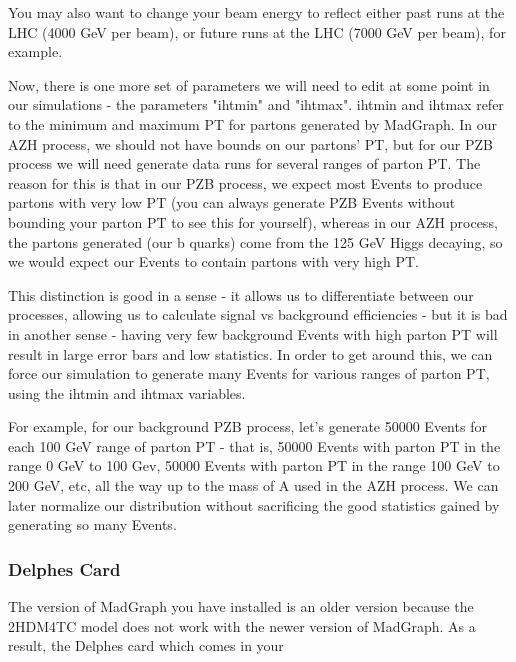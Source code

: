 \documentclass{article}
\begin{document}
\bigskip

You may also want to change your beam energy to reflect either past runs at the LHC (4000 GeV per beam), or future runs at the LHC (7000 GeV per beam), for example.

\bigskip

Now, there is one more set of parameters we will need to edit at some point in our simulations - the parameters "ihtmin" and "ihtmax".
ihtmin and ihtmax refer to the minimum and maximum PT for partons generated by MadGraph. In our AZH process, we should not have bounds
on our partons' PT, but for our PZB process we will need generate data runs for several ranges of parton PT. The reason for this is
that in our PZB process, we expect most Events to produce partons with very low PT (you can always generate PZB Events without bounding
your parton PT to see this for yourself), whereas in our AZH process, the partons generated (our b quarks) come from the 125 GeV Higgs decaying,
so we would expect our Events to contain partons with very high PT.

\bigskip

This distinction is good in a sense - it allows us to differentiate between
our processes, allowing us to calculate signal vs background efficiencies - but it is bad in another sense - having very few background Events
with high parton PT will result in large error bars and low statistics. In order to get around this, we can force our simulation to generate
many Events for various ranges of parton PT, using the ihtmin and ihtmax variables.

\bigskip

For example, for our background PZB process, let's generate
50000 Events for each 100 GeV range of parton PT - that is, 50000 Events with parton PT in the range 0 GeV to 100 Gev, 50000 Events with parton
PT in the range 100 GeV to 200 GeV, etc, all the way up to the mass of A used in the AZH process. We can later normalize our distribution without
sacrificing the good statistics gained by generating so many Events.

\subsubsection{Delphes Card}

The version of MadGraph you have installed is an older version because the 2HDM4TC model does
not work with the newer version of MadGraph. As a result, the Delphes card which comes in your
\end{document}
